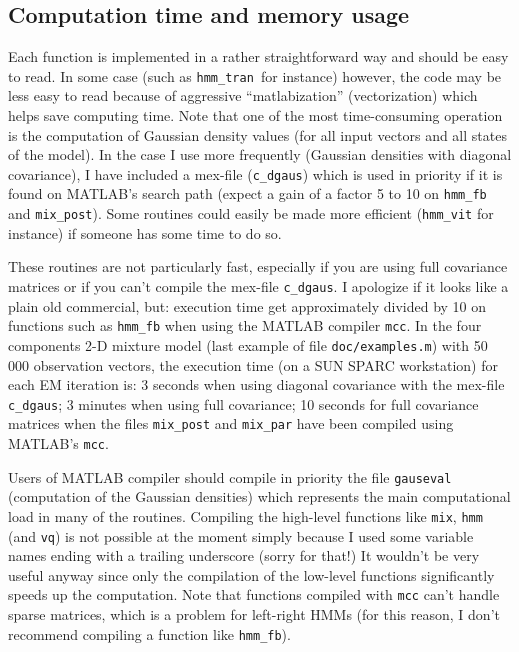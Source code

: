 \documentclass[a4paper,11pt]{article}
\begin{document}
\subsection{Computation time and memory usage}
Each function is implemented in a rather straightforward way and should be easy to read. In some case (such as \verb:hmm_tran :for instance) however, the code may be less easy to read because of aggressive ``matlabization'' (vectorization) which helps save computing time. Note that one of the most time-consuming operation is the computation of Gaussian density values (for all input vectors and all states of the model). In the case I use more frequently (Gaussian densities with diagonal covariance), I have included a mex-file (\verb:c_dgaus:) which is used in priority if it is found on MATLAB's search path (expect a gain of a factor 5 to 10 on \verb:hmm_fb: and \verb:mix_post:). Some routines could easily be made more efficient (\verb:hmm_vit: for instance) if someone has some time to do so.

These routines are not particularly fast, especially if you are using full covariance matrices or if you can't compile the mex-file \verb:c_dgaus:. I apologize if it looks like a plain old commercial, but: execution time get approximately divided by 10 on functions such as \verb:hmm_fb: when using the MATLAB compiler \verb:mcc:. In the four components 2-D mixture model (last example of file \verb+doc/examples.m+) with 50 000 observation vectors, the execution time (on a SUN SPARC workstation) for each EM iteration is: 3 seconds when using diagonal covariance with the mex-file \verb+c_dgaus+; 3 minutes when using full covariance; 10 seconds for full covariance matrices when the files \verb+mix_post+ and \verb+mix_par+ have been compiled using MATLAB's \verb+mcc+.

Users of MATLAB compiler should compile in priority the file {\tt gauseval} (computation of the Gaussian densities) which represents the main computational load in many of the routines. Compiling the high-level functions like {\tt mix}, {\tt hmm} (and {\tt vq}) is not possible at the moment simply because I used some variable names ending with a trailing underscore (sorry for that!) It wouldn't be very useful anyway since only the compilation of the low-level functions significantly speeds up the computation. Note that functions compiled with {\tt mcc} can't handle sparse matrices, which is a problem for left-right HMMs (for this reason, I don't recommend compiling a function like \verb+hmm_fb+).
\end{document}
